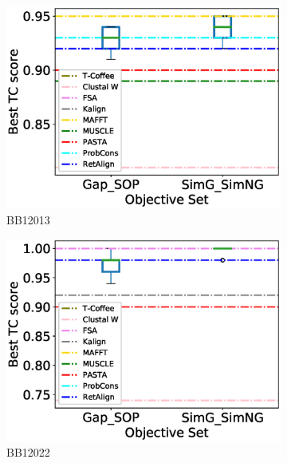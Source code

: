 \begin{figure}[!htbp]
\begin{adjustwidth}{-1.5cm}{-1cm}
\begin{subfigure}{0.22\textwidth}
			\includegraphics[width=\columnwidth]{Figure/summary/precomputedInit/Balibase/BB12013_objset_tc_rank_2}
			\caption{BB12013}
		\end{subfigure}
		\begin{subfigure}{0.22\textwidth}
			\includegraphics[width=\columnwidth]{Figure/summary/precomputedInit/Balibase/BB12022_objset_tc_rank_2}
			\caption{BB12022}
		\end{subfigure}
		\begin{subfigure}{0.22\textwidth}

\end{subfigure}
\end{adjustwidth}
\end{figure}
